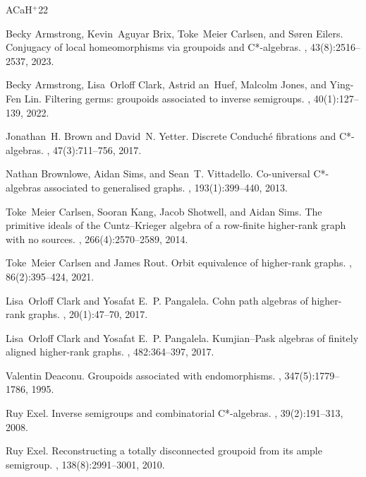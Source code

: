 \documentclass[11pt]{amsart}
\theoremstyle{definition}
\numberwithin{thm}{section}
\numberwithin{equation}{section}
\begin{document}
\newcommand{\etalchar}[1]{$^{#1}$}
\begin{thebibliography}{ACaH{\etalchar{+}}22}

Becky Armstrong, Kevin~Aguyar Brix, Toke~Meier Carlsen, and Søren Eilers.
\newblock Conjugacy of local homeomorphisms via groupoids and {C}*-algebras.
, 43(8):2516--2537, 2023.

\bibitem[ACaH{\etalchar{+}}22]{ACaHJL}
Becky Armstrong, Lisa~Orloff Clark, Astrid an~Huef, Malcolm Jones, and Ying-Fen Lin.
\newblock Filtering germs: groupoids associated to inverse semigroups.
, 40(1):127--139, 2022.

Jonathan~H. Brown and David~N. Yetter.
\newblock Discrete {C}onduch\'e{} fibrations and {C}*-algebras.
, 47(3):711--756, 2017.

Nathan Brownlowe, Aidan Sims, and Sean~T. Vittadello.
\newblock Co-universal {C}*-algebras associated to generalised graphs.
, 193(1):399--440, 2013.

Toke~Meier Carlsen, Sooran Kang, Jacob Shotwell, and Aidan Sims.
\newblock The primitive ideals of the {C}untz--{K}rieger algebra of a row-finite higher-rank graph with no sources.
, 266(4):2570--2589, 2014.

Toke~Meier Carlsen and James Rout.
\newblock Orbit equivalence of higher-rank graphs.
, 86(2):395--424, 2021.

Lisa~Orloff Clark and Yosafat E.~P. Pangalela.
\newblock Cohn path algebras of higher-rank graphs.
, 20(1):47--70, 2017.

Lisa~Orloff Clark and Yosafat E.~P. Pangalela.
\newblock Kumjian--{P}ask algebras of finitely aligned higher-rank graphs.
, 482:364--397, 2017.

Valentin Deaconu.
\newblock Groupoids associated with endomorphisms.
, 347(5):1779--1786, 1995.

Ruy Exel.
\newblock Inverse semigroups and combinatorial {C}*-algebras.
, 39(2):191--313, 2008.

Ruy Exel.
\newblock Reconstructing a totally disconnected groupoid from its ample semigroup.
, 138(8):2991--3001, 2010.


\end{thebibliography}
\end{document}
